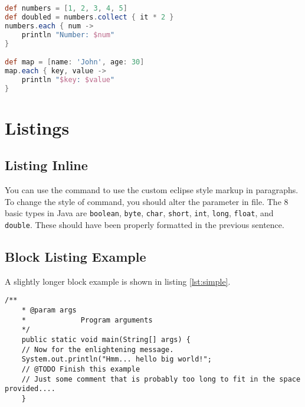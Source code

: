 	\begin{lstlisting}[language=Groovy]
def numbers = [1, 2, 3, 4, 5]
def doubled = numbers.collect { it * 2 }
numbers.each { num ->
	println "Number: $num"
}

def map = [name: 'John', age: 30]
map.each { key, value ->
	println "$key: $value"
}
	\end{lstlisting}



\section{Listings}


	\subsection*{Listing Inline}
	
	\lstset{breaklines=false}
	
	You can use the  command to use the custom
	eclipse style markup in paragraphs. To change the style of  command, you should alter the parameter  in  file.  The 8 basic types in Java are
	\lstinline$boolean$, \lstinline$byte$, \lstinline$char$,
	\lstinline$short$, \lstinline$int$, \lstinline$long$,
	\lstinline$float$, and \lstinline$double$. These should have been
	properly formatted in the previous sentence.
	
	\lstset{breaklines=true}
	
	\subsection*{Block Listing Example}
	
	A slightly longer block example is shown in listing \ref{lst:simple}.
	
	\begin{lstlisting}[caption={A simple listing.}, label={lst:simple}]
	/**
	* @param args
	*             Program arguments
	*/
	public static void main(String[] args) {
	// Now for the enlightening message.
	System.out.println("Hmm... hello big world!";
	// @TODO Finish this example
	// Just some comment that is probably too long to fit in the space provided....
	}
	\end{lstlisting}
	
